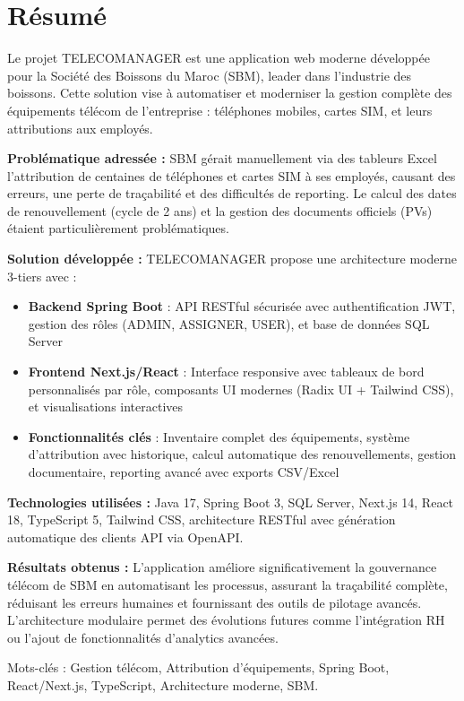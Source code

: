 \documentclass[12pt,a4paper]{report}
\begin{document}
\chapter*{Résumé}
Le projet TELECOMANAGER est une application web moderne développée pour la Société des Boissons du Maroc (SBM), leader dans l'industrie des boissons. Cette solution vise à automatiser et moderniser la gestion complète des équipements télécom de l'entreprise : téléphones mobiles, cartes SIM, et leurs attributions aux employés.

\textbf{Problématique adressée :} SBM gérait manuellement via des tableurs Excel l'attribution de centaines de téléphones et cartes SIM à ses employés, causant des erreurs, une perte de traçabilité et des difficultés de reporting. Le calcul des dates de renouvellement (cycle de 2 ans) et la gestion des documents officiels (PVs) étaient particulièrement problématiques.

\textbf{Solution développée :} TELECOMANAGER propose une architecture moderne 3-tiers avec :
\begin{itemize}
\item \textbf{Backend Spring Boot} : API RESTful sécurisée avec authentification JWT, gestion des rôles (ADMIN, ASSIGNER, USER), et base de données SQL Server
\item \textbf{Frontend Next.js/React} : Interface responsive avec tableaux de bord personnalisés par rôle, composants UI modernes (Radix UI + Tailwind CSS), et visualisations interactives
\item \textbf{Fonctionnalités clés} : Inventaire complet des équipements, système d'attribution avec historique, calcul automatique des renouvellements, gestion documentaire, reporting avancé avec exports CSV/Excel
\end{itemize}

\textbf{Technologies utilisées :} Java 17, Spring Boot 3, SQL Server, Next.js 14, React 18, TypeScript 5, Tailwind CSS, architecture RESTful avec génération automatique des clients API via OpenAPI.

\textbf{Résultats obtenus :} L'application améliore significativement la gouvernance télécom de SBM en automatisant les processus, assurant la traçabilité complète, réduisant les erreurs humaines et fournissant des outils de pilotage avancés. L'architecture modulaire permet des évolutions futures comme l'intégration RH ou l'ajout de fonctionnalités d'analytics avancées.

Mots-clés : Gestion télécom, Attribution d'équipements, Spring Boot, React/Next.js, TypeScript, Architecture moderne, SBM.
\end{document}
